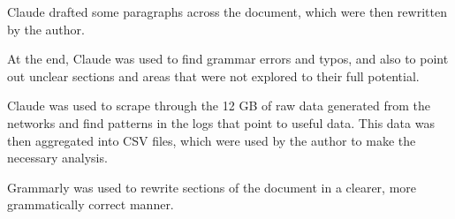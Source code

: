 
\begin{AIDcomment}
Claude drafted some paragraphs across the document, which were then rewritten by the author.
\end{AIDcomment}

\begin{AIDcomment}
At the end, Claude was used to find grammar errors and typos, and also to point out unclear sections and areas that were not explored to their full potential.
\end{AIDcomment}

\begin{AIDcomment}
Claude was used to scrape through the 12 GB of raw data generated from the networks and find patterns in the logs that point to useful data. This data was then aggregated into CSV files, which were used by the author to make the necessary analysis.
\end{AIDcomment}

\begin{AIDcomment}
Grammarly was used to rewrite sections of the document in a clearer, more grammatically correct manner.
\end{AIDcomment}








